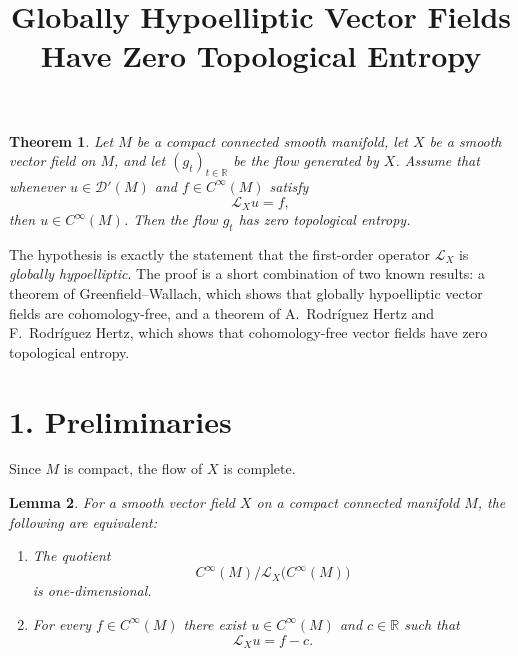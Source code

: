 \documentclass[11pt]{article}
\newtheorem{theorem}{Theorem}
\newtheorem{lemma}[theorem]{Lemma}
\theoremstyle{definition}
\theoremstyle{remark}
\begin{document}
\title{Globally Hypoelliptic Vector Fields Have Zero Topological Entropy}
\date{}
\maketitle

\begin{theorem}\label{thm:main}
Let $M$ be a compact connected smooth manifold, let $X$ be a smooth vector field on $M$, and let $(g_t)_{t\in\mathbb R}$ be the flow generated by $X$. Assume that whenever $u\in\mathcal D'(M)$ and $f\in C^\infty(M)$ satisfy
\[
\mathcal L_X u=f,
\]
then $u\in C^\infty(M)$. Then the flow $g_t$ has zero topological entropy.
\end{theorem}

\medskip

The hypothesis is exactly the statement that the first-order operator $\mathcal L_X$ is \emph{globally hypoelliptic}. The proof is a short combination of two known results: a theorem of Greenfield--Wallach, which shows that globally hypoelliptic vector fields are cohomology-free, and a theorem of A.~Rodr\'iguez Hertz and F.~Rodr\'iguez Hertz, which shows that cohomology-free vector fields have zero topological entropy.

\section*{1. Preliminaries}

Since $M$ is compact, the flow of $X$ is complete.

\begin{lemma}\label{lem:cohfree-equiv}
For a smooth vector field $X$ on a compact connected manifold $M$, the following are equivalent:
\begin{enumerate}
\item[(i)] The quotient
\[
C^\infty(M)\big/\mathcal L_X\bigl(C^\infty(M)\bigr)
\]
is one-dimensional.
\item[(ii)] For every $f\in C^\infty(M)$ there exist $u\in C^\infty(M)$ and $c\in\mathbb R$ such that
\[
\mathcal L_X u=f-c.
\]
\end{enumerate}
\end{lemma}
\end{document}
